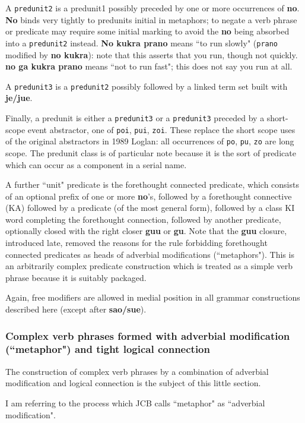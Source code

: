 \documentclass[12pt]{book}
\begin{document}
A {\tt predunit2} is a predunit1 possibly preceded by one or more occurrences of {\bf no}.  {\bf No} binds very tightly to predunits initial in metaphors;  to negate a verb phrase or predicate may require some initial marking to avoid the {\bf no} being absorbed into a {\tt predunit2} instead.  {\bf No kukra prano}
means ``to run slowly" ({\tt prano} modified by {\bf no kukra}):  note that this asserts that you run, though not quickly.  {\bf no ga kukra prano}
means ``not to run fast";  this does not say you run at all.

A {\tt predunit3} is a {\tt predunit2} possibly followed by a linked term set built with {\bf je/jue}.

Finally, a predunit is either a {\tt predunit3} or a {\tt predunit3} preceded by a short-scope event abstractor, one of {\tt poi}, {\tt pui}, {\tt zoi}.
These replace the short scope uses of the original abstractors in 1989 Loglan:  all occurrences of {\tt po}, {\tt pu}, {\tt zo} are long scope.  The predunit class is of particular note because it is the sort of predicate which can occur as a component in a serial name.

A further ``unit" predicate is the forethought connected predicate, which consists of an optional prefix of one or more {\bf no}'s, followed
by a forethought connective (KA) followed by a predicate (of the most general form), followed by a class KI word completing the forethought connection, followed by another predicate, optionally closed with the right closer {\bf guu} or {\bf gu}.  Note that the {\bf guu} closure, introduced late, removed the reasons for the rule forbidding forethought connected predicates as heads of adverbial modifications (``metaphors").  This is an arbitrarily complex predicate construction which is treated as a simple verb phrase because it is suitably packaged.

Again, free modifiers are allowed in medial position in all grammar constructions described here (except after {\bf sao/sue}).

\subsubsection{Complex verb phrases formed with adverbial modification (``metaphor") and tight logical connection}

The construction of complex verb phrases by a combination of adverbial modification and logical connection is the subject of this little section.

I am referring to the process which JCB calls ``metaphor" as ``adverbial modification".
\end{document}
